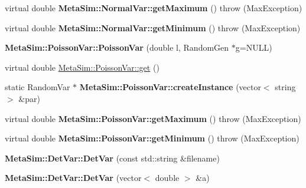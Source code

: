 \begin{DoxyCompactItemize}
\item 
virtual double {\bfseries Meta\+Sim\+::\+Normal\+Var\+::get\+Maximum} ()  throw (\+Max\+Exception)\hypertarget{group__metasim__random_ga25eef12ebe31b36c24835f425e023c0a}{}\label{group__metasim__random_ga25eef12ebe31b36c24835f425e023c0a}

\item 
virtual double {\bfseries Meta\+Sim\+::\+Normal\+Var\+::get\+Minimum} ()  throw (\+Max\+Exception)\hypertarget{group__metasim__random_gafd3ea9acd7f031c3abf5337b05119c86}{}\label{group__metasim__random_gafd3ea9acd7f031c3abf5337b05119c86}

\item 
{\bfseries Meta\+Sim\+::\+Poisson\+Var\+::\+Poisson\+Var} (double l, Random\+Gen $\ast$g=N\+U\+LL)\hypertarget{group__metasim__random_gad3bf380adb8787f5238f813d068cdcd3}{}\label{group__metasim__random_gad3bf380adb8787f5238f813d068cdcd3}

\item 
virtual double \hyperlink{group__metasim__random_gad487efc5f4bdde3e38e8bea5f937ef9b}{Meta\+Sim\+::\+Poisson\+Var\+::get} ()
\item 
static Random\+Var $\ast$ {\bfseries Meta\+Sim\+::\+Poisson\+Var\+::create\+Instance} (vector$<$ string $>$ \&par)\hypertarget{group__metasim__random_gaf4d4384c03b6c7ceabb1a547e1fefbb9}{}\label{group__metasim__random_gaf4d4384c03b6c7ceabb1a547e1fefbb9}

\item 
virtual double {\bfseries Meta\+Sim\+::\+Poisson\+Var\+::get\+Maximum} ()  throw (\+Max\+Exception)\hypertarget{group__metasim__random_ga60a02d8cc1f1edbb1d1fa1196e52eb12}{}\label{group__metasim__random_ga60a02d8cc1f1edbb1d1fa1196e52eb12}

\item 
virtual double {\bfseries Meta\+Sim\+::\+Poisson\+Var\+::get\+Minimum} ()  throw (\+Max\+Exception)\hypertarget{group__metasim__random_ga680cf6dff2240d8142669c4f4116c078}{}\label{group__metasim__random_ga680cf6dff2240d8142669c4f4116c078}

\item 
{\bfseries Meta\+Sim\+::\+Det\+Var\+::\+Det\+Var} (const std\+::string \&filename)\hypertarget{group__metasim__random_ga9dc9e400326612a9d6e1aa855c0725c9}{}\label{group__metasim__random_ga9dc9e400326612a9d6e1aa855c0725c9}

\item 
{\bfseries Meta\+Sim\+::\+Det\+Var\+::\+Det\+Var} (vector$<$ double $>$ \&a)\hypertarget{group__metasim__random_ga542ecc890f0ecaf7b039184058a1ab61}{}\label{group__metasim__random_ga542ecc890f0ecaf7b039184058a1ab61}


\end{DoxyCompactItemize}

